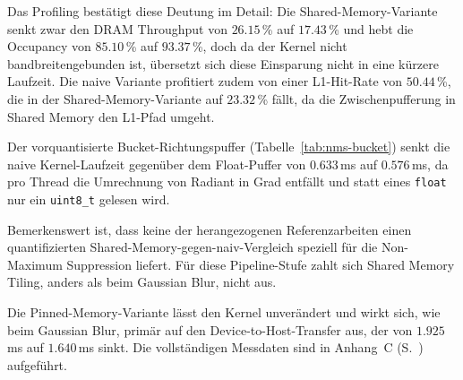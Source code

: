 Das Profiling bestätigt diese Deutung im Detail: Die Shared-Memory-Variante
senkt zwar den DRAM Throughput von $26.15$\,\% auf $17.43$\,\% und hebt die
Occupancy von $85.10$\,\% auf $93.37$\,\%, doch da der Kernel nicht
bandbreitengebunden ist, übersetzt sich diese Einsparung nicht in eine
kürzere Laufzeit. Die naive Variante profitiert zudem von einer
L1-Hit-Rate von $50.44$\,\%, die in der Shared-Memory-Variante auf
$23.32$\,\% fällt, da die Zwischenpufferung in Shared Memory den L1-Pfad
umgeht.

Der vorquantisierte Bucket-Richtungspuffer
(Tabelle~\ref{tab:nms-bucket}) senkt die naive Kernel-Laufzeit
gegenüber dem Float-Puffer von $0.633$\,ms auf $0.576$\,ms, da pro
Thread die Umrechnung von Radiant in Grad entfällt und statt eines
\texttt{float} nur ein \texttt{uint8\_t} gelesen wird.

Bemerkenswert ist, dass keine der herangezogenen Referenzarbeiten einen
quantifizierten Shared-Memory-gegen-naiv-Vergleich speziell für die
Non-Maximum Suppression liefert. Für diese Pipeline-Stufe zahlt sich
Shared Memory Tiling, anders als beim Gaussian Blur, nicht aus.

Die Pinned-Memory-Variante lässt den Kernel unverändert und wirkt sich,
wie beim Gaussian Blur, primär auf den Device-to-Host-Transfer aus, der
von $1.925$\,ms auf $1.640$\,ms sinkt. Die vollständigen Messdaten sind
in Anhang~C (S.~\pageref{app:nms-results}) aufgeführt.

